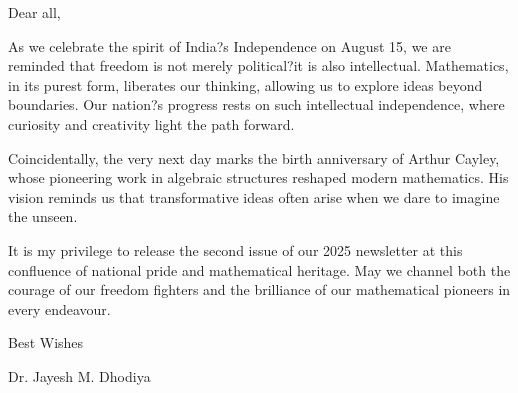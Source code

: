 \begin{minipage}{0.65\textwidth}
  Dear all,

As we celebrate the spirit of India?s Independence on August 15, we are reminded that freedom is not merely political?it is also intellectual. Mathematics, in its purest form, liberates our thinking, allowing us to explore ideas beyond boundaries. Our nation?s progress rests on such intellectual independence, where curiosity and creativity light the path forward.

Coincidentally, the very next day marks the birth anniversary of Arthur Cayley, whose pioneering work in algebraic structures reshaped modern mathematics. His vision reminds us that transformative ideas often arise when we dare to imagine the unseen.

It is my privilege to release the second issue of our 2025 newsletter at this confluence of national pride and mathematical heritage. May we channel both the courage of our freedom fighters and the brilliance of our mathematical pioneers in every endeavour.

Best Wishes

Dr. Jayesh M. Dhodiya
\end{minipage}

      \begin{minipage}{0.3\textwidth}
        \begin{center}
          \vspace{4cm}
        \end{center}
      \end{minipage}
      \hfill

\vspace{1cm}
